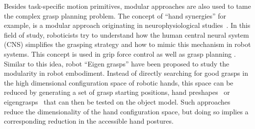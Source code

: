Besides task-specific motion primitives, modular approaches are also used to tame the complex grasp planning problem. The concept of ``hand synergies'' for example, is a modular approach originating in neurophysiological studies~\citep{santello1998postural,santello2000force}. In this field of study, roboticists try to understand how the human central neural system (CNS) simplifies the grasping strategy and how to mimic this mechanism in robot systems. This concept is used in grip force control \citep{gabiccini2011role} as well as grasp planning \citep{gioioso2013mapping}. Similar to this idea, robot ``Eigen grasps'' have been proposed to study the modularity in robot embodiment. Instead of directly searching for good grasps in the high dimensional configuration space of robotic hands, this space can be reduced by generating a set of grasp starting positions, hand preshapes~\cite{miller2003automatic} or eigengrasps~\cite{Ciocarlie2009} that can then be tested on the object model. Such approaches reduce the dimensionality of the hand configuration space, but doing so implies a corresponding reduction in the accessible hand postures.








